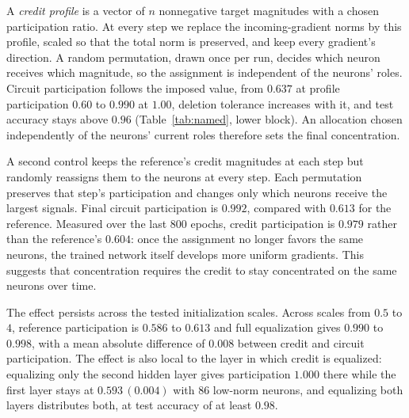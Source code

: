 \documentclass{article} %
\begin{document}
A \emph{credit profile} is a vector of $n$ nonnegative target magnitudes with a chosen participation ratio. At every step we replace the incoming-gradient norms by this profile, scaled so that the total norm is preserved, and keep every gradient's direction. A random permutation, drawn once per run, decides which neuron receives which magnitude, so the assignment is independent of the neurons' roles. Circuit participation follows the imposed value, from $0.637$ at profile participation $0.60$ to $0.990$ at $1.00$, deletion tolerance increases with it, and test accuracy stays above $0.96$ (Table~\ref{tab:named}, lower block). An allocation chosen independently of the neurons' current roles therefore sets the final concentration.

A second control keeps the reference's credit magnitudes at each step but randomly reassigns them to the neurons at every step. Each permutation preserves that step's participation and changes only which neurons receive the largest signals. Final circuit participation is $0.992$, compared with $0.613$ for the reference. Measured over the last $800$ epochs, credit participation is $0.979$ rather than the reference's $0.604$: once the assignment no longer favors the same neurons, the trained network itself develops more uniform gradients. This suggests that concentration requires the credit to stay concentrated on the same neurons over time.

The effect persists across the tested initialization scales. Across scales from $0.5$ to $4$, reference participation is $0.586$ to $0.613$ and full equalization gives $0.990$ to $0.998$, with a mean absolute difference of $0.008$ between credit and circuit participation. The effect is also local to the layer in which credit is equalized: equalizing only the second hidden layer gives participation $1.000$ there while the first layer stays at $0.593\,(0.004)$ with $86$ low-norm neurons, and equalizing both layers distributes both, at test accuracy of at least $0.98$.
\end{document}

